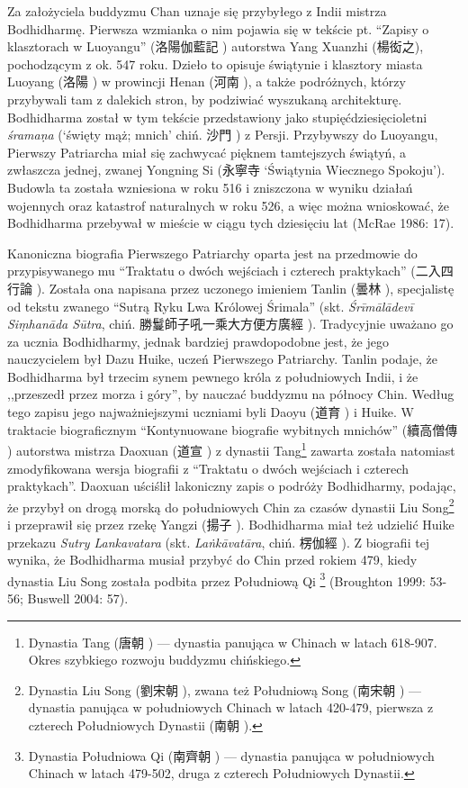 Za założyciela buddyzmu Chan uznaje się przybyłego z Indii mistrza Bodhidharmę.
Pierwsza wzmianka o nim pojawia się w tekście pt. ``Zapisy o klasztorach w Luoyangu'' (洛陽伽藍記 ) autorstwa Yang Xuanzhi (楊衒之), pochodzącym z ok. 547 roku.
Dzieło to opisuje świątynie i klasztory miasta Luoyang (洛陽 ) w prowincji Henan (河南 ), a także podróżnych, którzy przybywali tam z dalekich stron, by podziwiać wyszukaną architekturę.
Bodhidharma został w tym tekście przedstawiony jako stupięćdziesięcioletni \textit{śrama\d{n}a} (`święty mąż; mnich' chiń. 沙門 ) z Persji.
Przybywszy do Luoyangu, Pierwszy Patriarcha miał się zachwycać pięknem tamtejszych świątyń, a zwłaszcza jednej, zwanej Yongning Si (永寧寺  `Świątynia Wiecznego Spokoju').
Budowla ta została wzniesiona w roku 516 i zniszczona w wyniku działań wojennych oraz katastrof naturalnych w roku 526, a więc można wnioskować, że Bodhidharma przebywał w mieście w ciągu tych dziesięciu lat
(McRae 1986: 17).

Kanoniczna biografia Pierwszego Patriarchy oparta jest na przedmowie do przypisywanego mu ``Traktatu o dwóch wejściach i czterech praktykach'' (二入四行論 ).
Została ona napisana przez uczonego imieniem Tanlin (曇林 ), specjalistę od tekstu zwanego ``Sutrą Ryku Lwa Królowej Śrimala'' (skt. \textit{Śrīmālādevī Si\d{m}hanāda Sūtra}, chiń. 勝鬘師子吼一乘大方便方廣經 ).
Tradycyjnie uważano go za ucznia Bodhidharmy, jednak bardziej prawdopodobne jest, że jego nauczycielem był Dazu Huike, uczeń Pierwszego Patriarchy.
Tanlin podaje, że Bodhidharma był trzecim synem pewnego króla z południowych Indii, i że ,,przeszedł przez morza i góry'', by nauczać buddyzmu na północy Chin.
Według tego zapisu jego najważniejszymi uczniami byli Daoyu (道育 ) i Huike.
W traktacie biograficznym ``Kontynuowane biografie wybitnych mnichów'' (續高僧傳 ) autorstwa mistrza Daoxuan (道宣 ) z dynastii Tang\footnote{Dynastia Tang (唐朝 ) --- dynastia panująca w Chinach w latach 618-907. Okres szybkiego rozwoju buddyzmu chińskiego.} zawarta została natomiast zmodyfikowana wersja biografii z ``Traktatu o dwóch wejściach i czterech praktykach''.
Daoxuan uściślił lakoniczny zapis o podróży Bodhidharmy, podając, że przybył on drogą morską do południowych Chin za czasów dynastii Liu Song\footnote{Dynastia Liu Song (劉宋朝 ), zwana też Południową Song (南宋朝 ) --- dynastia panująca w południowych Chinach w latach 420-479, pierwsza z czterech Południowych Dynastii (南朝 ).} i przeprawił się przez rzekę Yangzi (揚子 ).
Bodhidharma miał też udzielić Huike przekazu \textit{Sutry Lankavatara} (skt. \textit{La\.nkāvatāra}, chiń. 楞伽經 ).
Z biografii tej wynika, że Bodhidharma musiał przybyć do Chin przed rokiem 479, kiedy dynastia Liu Song została podbita przez Południową Qi%
\footnote{Dynastia Południowa Qi (南齊朝 ) --- dynastia panująca w południowych Chinach w latach 479-502, druga z czterech Południowych Dynastii.}
(Broughton 1999: 53-56; Buswell 2004: 57).


